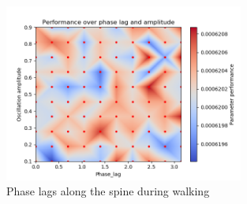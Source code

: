 \documentclass{cmc}
\begin{document}
\begin{figure}[H]
  \centering
  \includegraphics[width=0.7\textwidth]{figures/Performance.png}
  \caption{Phase lags along the spine during walking}
  \label{fig:exercise8c_phaseLag}
\end{figure}
\end{document}
